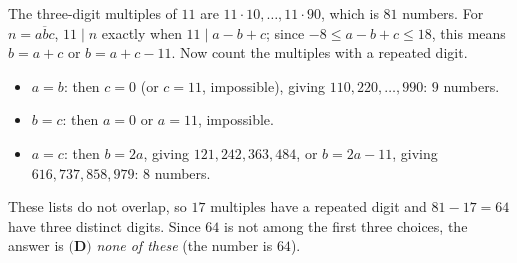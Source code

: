 The three-digit multiples of $11$ are $11\cdot10,\dots,11\cdot90$, which is $81$ numbers. For $n=\overline{abc}$, $11\mid n$ exactly when $11\mid a-b+c$; since $-8\le a-b+c\le18$, this means $b=a+c$ or $b=a+c-11$. Now count the multiples with a repeated digit.
\begin{itemize}
\item $a=b$: then $c=0$ (or $c=11$, impossible), giving $110,220,\dots,990$: $9$ numbers.
\item $b=c$: then $a=0$ or $a=11$, impossible.
\item $a=c$: then $b=2a$, giving $121,242,363,484$, or $b=2a-11$, giving $616,737,858,979$: $8$ numbers.
\end{itemize}
These lists do not overlap, so $17$ multiples have a repeated digit and $81-17=64$ have three distinct digits. Since $64$ is not among the first three choices, the answer is $\textbf{(D)}$ \emph{none of these} (the number is $\boxed{64}$).
